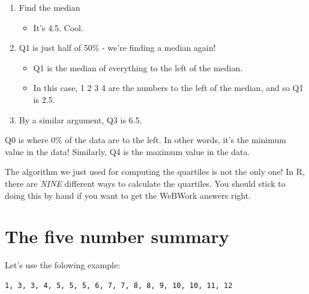 \documentclass[
  letterpaper,
  DIV=11,
  numbers=noendperiod]{scrreprt}
\providecommand{\tightlist}{%
  \setlength{\itemsep}{0pt}\setlength{\parskip}{0pt}}\usepackage{longtable,booktabs,array}
\begin{document}
\begin{enumerate}
\def\labelenumi{\arabic{enumi}.}
\tightlist
\item
  Find the median

  \begin{itemize}
  \tightlist
  \item
    It's 4.5. Cool.
  \end{itemize}
\item
  Q1 is just half of 50\% - we're finding a median again!

  \begin{itemize}
  \tightlist
  \item
    Q1 is the median of everything to the left of the median.
  \item
    In this case, 1 2 3 4 are the numbers to the left of the median, and
    so Q1 is 2.5.
  \end{itemize}
\item
  By a similar argument, Q3 is 6.5.
\end{enumerate}

Q0 is where 0\% of the data are to the left. In other words, it's the
minimum value in the data! Similarly, Q4 is the maximum value in the
data.

\begin{tcolorbox}[enhanced jigsaw, opacitybacktitle=0.6, left=2mm, colbacktitle=quarto-callout-warning-color!10!white, colframe=quarto-callout-warning-color-frame, breakable, toptitle=1mm, title=\textcolor{quarto-callout-warning-color}{\faExclamationTriangle}\hspace{0.5em}{Warning}, opacityback=0, bottomrule=.15mm, toprule=.15mm, arc=.35mm, leftrule=.75mm, titlerule=0mm, bottomtitle=1mm, colback=white, rightrule=.15mm, coltitle=black]

The algorithm we just used for computing the quartiles is not the only
one! In R, there are \emph{NINE} different ways to calculate the
quartiles. You should stick to doing this by hand if you want to get the
WeBWork answers right.

\end{tcolorbox}

\hypertarget{the-five-number-summary}{%
\section{The five number summary}\label{the-five-number-summary}}

Let's use the folowing example:

\begin{verbatim}
1, 3, 3, 4, 5, 5, 5, 6, 7, 7, 8, 8, 9, 10, 10, 11, 12
\end{verbatim}
\end{document}

